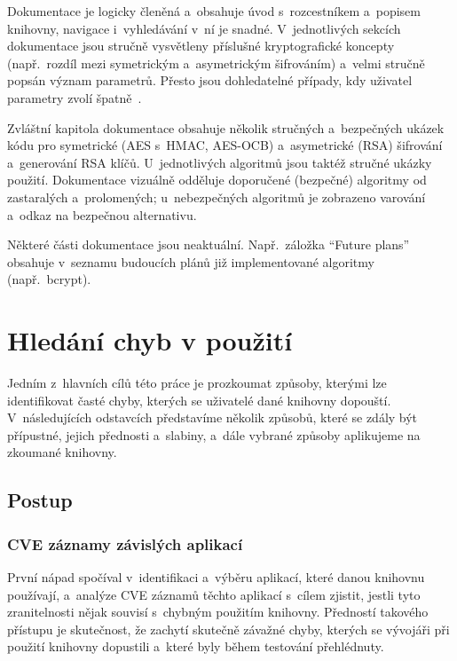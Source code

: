 Dokumentace je logicky členěná a~obsahuje úvod s~rozcestníkem a~popisem knihovny, navigace i~vyhledávání v~ní je snadné. V~jednotlivých sekcích dokumentace jsou stručně vysvětleny příslušné kryptografické koncepty (např.\ rozdíl mezi symetrickým a~asymetrickým šifrováním) a~velmi stručně popsán význam parametrů. Přesto jsou dohledatelné případy, kdy uživatel parametry zvolí špatně~\cite{pythonspider-issue}.

Zvláštní kapitola dokumentace obsahuje několik stručných a~bezpečných ukázek kódu pro symetrické (AES s~HMAC, AES-OCB) a~asymetrické (RSA) šifrování a~generování RSA klíčů. U~jednotlivých algoritmů jsou taktéž stručné ukázky použití. Dokumentace vizuálně odděluje doporučené (bezpečné) algoritmy od zastaralých a~prolomených; u~nebezpečných algoritmů je zobrazeno varování a~odkaz na bezpečnou alternativu.

Některé části dokumentace jsou neaktuální. Např.\ záložka ``Future plans'' obsahuje v~seznamu budoucích plánů již implementované algoritmy (např.\ bcrypt).

\section{Hledání chyb v použití}
\label{analyza-hledani}

Jedním z~hlavních cílů této práce je prozkoumat způsoby, kterými lze identifikovat časté chyby, kterých se uživatelé dané knihovny dopouští. V~následujících odstavcích představíme několik způsobů, které se zdály být přípustné, jejich přednosti a~slabiny, a~dále vybrané způsoby aplikujeme na zkoumané knihovny.

\subsection{Postup}

\subsubsection*{CVE záznamy závislých aplikací}

První nápad spočíval v~identifikaci a~výběru aplikací, které danou knihovnu používají, a~analýze CVE záznamů těchto aplikací s~cílem zjistit, jestli tyto zranitelnosti nějak souvisí s~chybným použitím knihovny. Předností takového přístupu je skutečnost, že zachytí skutečně závažné chyby, kterých se vývojáři při použití knihovny dopustili a~které byly během testování přehlédnuty.

